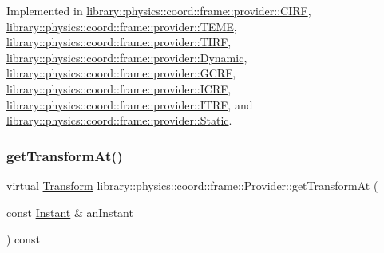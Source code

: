 Implemented in \hyperlink{classlibrary_1_1physics_1_1coord_1_1frame_1_1provider_1_1_c_i_r_f_af75424e9e3a86a5aa06f998a8710c5c2}{library\+::physics\+::coord\+::frame\+::provider\+::\+C\+I\+RF}, \hyperlink{classlibrary_1_1physics_1_1coord_1_1frame_1_1provider_1_1_t_e_m_e_a606d0c4cad7df776e848fd3670e5cc7f}{library\+::physics\+::coord\+::frame\+::provider\+::\+T\+E\+ME}, \hyperlink{classlibrary_1_1physics_1_1coord_1_1frame_1_1provider_1_1_t_i_r_f_a48ef3f686e9bcc744a5e3d1fa1779ab6}{library\+::physics\+::coord\+::frame\+::provider\+::\+T\+I\+RF}, \hyperlink{classlibrary_1_1physics_1_1coord_1_1frame_1_1provider_1_1_dynamic_a9d1c9b905420f026fa2f9c26305e47fd}{library\+::physics\+::coord\+::frame\+::provider\+::\+Dynamic}, \hyperlink{classlibrary_1_1physics_1_1coord_1_1frame_1_1provider_1_1_g_c_r_f_ae32853b62bfe251fd48262b7ab383fc7}{library\+::physics\+::coord\+::frame\+::provider\+::\+G\+C\+RF}, \hyperlink{classlibrary_1_1physics_1_1coord_1_1frame_1_1provider_1_1_i_c_r_f_a06ce5c7c4bc22045d612d951cbeb4d14}{library\+::physics\+::coord\+::frame\+::provider\+::\+I\+C\+RF}, \hyperlink{classlibrary_1_1physics_1_1coord_1_1frame_1_1provider_1_1_i_t_r_f_a0408f17419e49f785863ba7a84865857}{library\+::physics\+::coord\+::frame\+::provider\+::\+I\+T\+RF}, and \hyperlink{classlibrary_1_1physics_1_1coord_1_1frame_1_1provider_1_1_static_aa9062e601039a575302ea34e87e4dedc}{library\+::physics\+::coord\+::frame\+::provider\+::\+Static}.

\mbox{\label{classlibrary_1_1physics_1_1coord_1_1frame_1_1_provider_a796fd2dd337f1304a0e9acf573ce2550}} 
\subsubsection{\texorpdfstring{get\+Transform\+At()}{getTransformAt()}}
{\footnotesize\ttfamily virtual \hyperlink{classlibrary_1_1physics_1_1coord_1_1_transform}{Transform} library\+::physics\+::coord\+::frame\+::\+Provider\+::get\+Transform\+At (\begin{DoxyParamCaption}\item[{const \hyperlink{classlibrary_1_1physics_1_1time_1_1_instant}{Instant} \&}]{an\+Instant }\end{DoxyParamCaption}) const\hspace{0.3cm}{\ttfamily [pure virtual]}}



